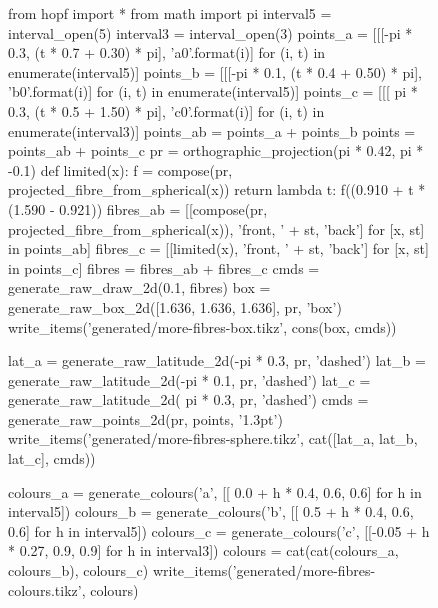 \begin{figure}
\begin{python}
from hopf import *
from math import pi
interval5 = interval_open(5)
interval3 = interval_open(3)
points_a  = [[[-pi * 0.3, (t * 0.7 + 0.30) * pi], 'a{0}'.format(i)] for (i, t) in enumerate(interval5)]
points_b  = [[[-pi * 0.1, (t * 0.4 + 0.50) * pi], 'b{0}'.format(i)] for (i, t) in enumerate(interval5)]
points_c  = [[[ pi * 0.3, (t * 0.5 + 1.50) * pi], 'c{0}'.format(i)] for (i, t) in enumerate(interval3)]
points_ab = points_a + points_b
points    = points_ab + points_c
pr        = orthographic_projection(pi * 0.42, pi * -0.1)
def limited(x):
    f = compose(pr, projected_fibre_from_spherical(x))
    return lambda t: f((0.910 + t * (1.590 - 0.921)) %
fibres_ab = [[compose(pr, projected_fibre_from_spherical(x)), 'front, ' + st, 'back'] for [x, st] in points_ab]
fibres_c  = [[limited(x), 'front, ' + st, 'back'] for [x, st] in points_c]
fibres    = fibres_ab + fibres_c
cmds      = generate_raw_draw_2d(0.1, fibres)
box       = generate_raw_box_2d([1.636, 1.636, 1.636], pr, 'box')
write_items('generated/more-fibres-box.tikz', cons(box, cmds))

lat_a   = generate_raw_latitude_2d(-pi * 0.3, pr, 'dashed')
lat_b   = generate_raw_latitude_2d(-pi * 0.1, pr, 'dashed')
lat_c   = generate_raw_latitude_2d( pi * 0.3, pr, 'dashed')
cmds    = generate_raw_points_2d(pr, points, '1.3pt')
write_items('generated/more-fibres-sphere.tikz', cat([lat_a, lat_b, lat_c], cmds))

colours_a = generate_colours('a', [[  0.0 + h * 0.4,  0.6, 0.6] for h in interval5])
colours_b = generate_colours('b', [[  0.5 + h * 0.4,  0.6, 0.6] for h in interval5])
colours_c = generate_colours('c', [[-0.05 + h * 0.27, 0.9, 0.9] for h in interval3])
colours   = cat(cat(colours_a, colours_b), colours_c)
write_items('generated/more-fibres-colours.tikz', colours)
\end{python}
\begin{center}
\tikzexternalenable
{}
\end{center}
\end{figure}
